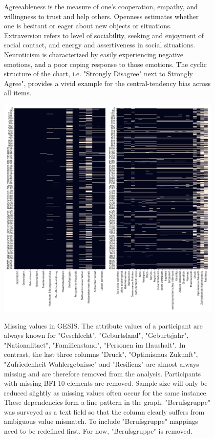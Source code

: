 \begin{appendices}
\begin{figure}[ht]
\begin{center}
\caption{Agreeableness is the measure of one's cooperation, empathy, and willingness to trust and help others. Openness estimates whether one is hesitant or eager about new objects or situations. Extraversion refers to level of sociability, seeking and enjoyment of social contact, and energy and assertiveness in social situations. Neuroticism is characterized by easily experiencing negative emotions, and a poor coping response to those emotions. The cyclic structure of the chart, i.e. "Strongly Disagree" next to Strongly Agree", provides a vivid example for the central-tendency bias across all items.}
\end{center}
\end{figure}

\begin{figure}[h]
	\begin{center}
		\includegraphics[scale=0.50,angle=0]{fig/gesis_missing}
		\label{gesis_miss}
		\caption{Missing values in GESIS. The attribute values of a participant are always known for "Geschlecht", "Geburtsland", "Geburtsjahr", "Nationalitaet", "Familienstand", "Personen im Haushalt". In contrast, the last three columns "Druck", "Optimismus Zukunft", "Zufriedenheit Wahlergebnisse" and "Resilienz" are almost always missing and are therefore removed from the analysis. Participants with missing BFI-10 elements are removed. Sample size will only be reduced slightly as missing values often occur for the same instance. These dependencies form a line pattern in the graph. "Berufsgruppe" was surveyed as a text field so that the column clearly suffers from ambiguous value mismatch. To include "Berufsgruppe" mappings need to be redefined first. For now, "Berufsgruppe" is removed. }
	\end{center}
\end{figure}


\end{appendices}
